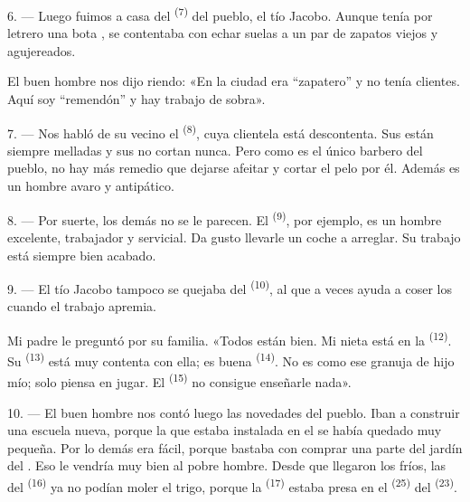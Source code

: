 6. --- Luego fuimos a casa del  \textsuperscript{(7)} del pueblo, el
tío Jacobo. Aunque tenía por letrero una bota , se
contentaba con echar suelas a un par de zapatos viejos y agujereados.

El buen hombre nos dijo riendo: «En la ciudad era “zapatero” y no tenía
clientes. Aquí soy “remendón” y hay trabajo de sobra».

7. --- Nos habló de su vecino el  \textsuperscript{(8)}, cuya
clientela está descontenta. Sus  están siempre melladas y
sus  no cortan nunca. Pero como es el único barbero del
pueblo, no hay más remedio que dejarse afeitar y cortar el pelo por él.
Además es un hombre avaro y antipático.

8. --- Por suerte, los demás  no se le parecen. El
 \textsuperscript{(9)}, por ejemplo, es un hombre
excelente, trabajador y servicial. Da gusto llevarle un coche a arreglar.
Su trabajo está siempre bien acabado.

9. --- El tío Jacobo tampoco se quejaba del 
\textsuperscript{(10)}, al que a veces ayuda a coser los  cuando el
trabajo apremia.

Mi padre le preguntó por su familia. «Todos están bien. Mi nieta está en
la  \textsuperscript{(12)}. Su  \textsuperscript{(13)} está
muy contenta con ella; es buena  \textsuperscript{(14)}. No es como
ese granuja de hijo mío; solo piensa en jugar. El 
\textsuperscript{(15)} no consigue enseñarle nada».

\VUsaut{3.0mm}
\VUsaut{3.0mm}

10. --- El buen hombre nos contó luego las novedades del pueblo. Iban a
construir una escuela nueva, porque la que estaba instalada en el
 se había quedado muy pequeña. Por lo demás era fácil,
porque bastaba con comprar una parte del jardín del . Eso
le vendría muy bien al pobre hombre. Desde que llegaron los fríos, las
 del  \textsuperscript{(16)} ya no podían moler el trigo,
porque la  \textsuperscript{(17)} estaba presa en el 
\textsuperscript{(25)} del  \textsuperscript{(23)}.

